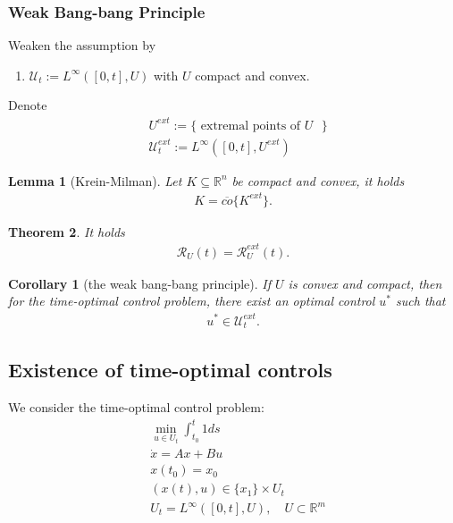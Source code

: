 \documentclass[a4paper,11pt,fleqn]{book}
\newtheorem{theorem}{Theorem}[section]
\newtheorem{corollary}{Corollary}[theorem]
\newtheorem{lemma}[theorem]{Lemma}
\theoremstyle{definition}
\theoremstyle{remark}
\begin{document}
\subsubsection{Weak Bang-bang Principle}
Weaken the assumption by
\begin{enumerate}
	\item $\mathcal{U}_t:= L^\infty([0, t], U)$ with $U$ compact and convex. 
\end{enumerate}
Denote 
\begin{align*}
	& U^{ext}:= \{\text{ extremal points of $U$ }\}\\
	& \mathcal{U}_t^{ext}:= L^\infty([0, t], U^{ext})
\end{align*}

\begin{lemma}[Krein-Milman]
	Let $K \subseteq \mathbb{R}^n$ be compact and convex, it holds
	\begin{align*}
		K = \overline{co}\{K^{ext}\}. 
	\end{align*}
\end{lemma}

\begin{theorem}
	It holds
	\begin{align*}
		\mathcal{R}_U(t) = \mathcal{R}_U^{ext}(t).
	\end{align*}
\end{theorem}

\begin{corollary}[the weak bang-bang principle]
	If $U$ is convex and compact, then for the time-optimal control problem, there exist an optimal control $u^*$ such that 
	\begin{align*}
		u^* \in \mathcal{U}^{ext}_t. 
	\end{align*}
\end{corollary}



\subsection{Existence of time-optimal controls}
We consider the time-optimal control problem:
\begin{align*}
	& \min_{u \in U_{t}} \int_{t_0}^{t} 1 ds\\
	& \dot{x} = A x + Bu\\
	& x(t_0) = x_0\\
	& (x(t), u) \in \{x_1\} \times  U_t\\
	& U_t =  L^\infty([0, t], U), \quad U \subset \mathbb{R}^m 
\end{align*}
\end{document}

